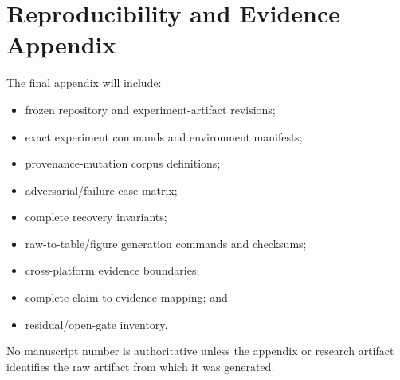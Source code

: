\section{Reproducibility and Evidence Appendix}

The final appendix will include:
\begin{itemize}
  \item frozen repository and experiment-artifact revisions;
  \item exact experiment commands and environment manifests;
  \item provenance-mutation corpus definitions;
  \item adversarial/failure-case matrix;
  \item complete recovery invariants;
  \item raw-to-table/figure generation commands and checksums;
  \item cross-platform evidence boundaries;
  \item complete claim-to-evidence mapping; and
  \item residual/open-gate inventory.
\end{itemize}

No manuscript number is authoritative unless the appendix or research artifact identifies the raw artifact from which it was generated.

